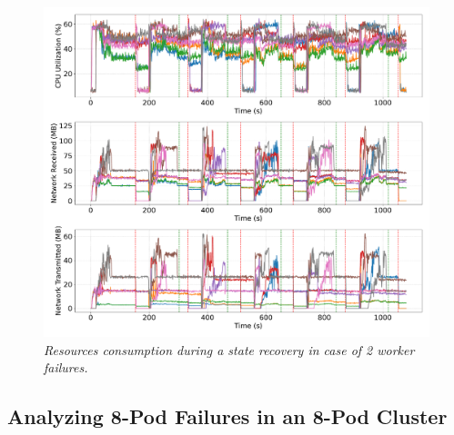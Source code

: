 \begin{figure}[H]
    \centering
    \includegraphics[width=1\textwidth]{figures/kstreams-2pods/kafka_2_pods_resources}
    \caption{\textit{Resources consumption during a state recovery in case of 2 worker failures.}}
    \label{fig:kafka-2pods-resource}
\end{figure}


\newpage
\subsection{Analyzing 8-Pod Failures in an 8-Pod Cluster}\label{subsec:analyzing-8-pod-failures-in-an-8-pod-cluster}

